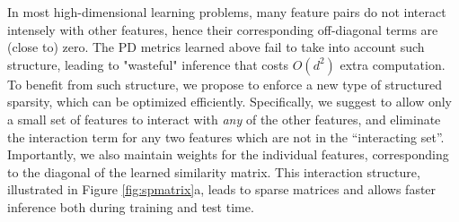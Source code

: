 \documentclass[twoside,11pt]{article}
\begin{document}
In most high-dimensional learning problems, many feature pairs do not interact intensely with other features, hence their corresponding off-diagonal terms are (close to) zero. The PD metrics learned above fail to take into account such structure, leading to  "wasteful" inference that costs $O(d^2)$ extra computation. To benefit from such structure, we propose to enforce a new type of structured sparsity, which can be optimized efficiently. Specifically, we suggest to allow only a small set of features to interact with \emph{any} of the other features, and eliminate the interaction term for any two features which are not in the ``interacting set''. Importantly, we also maintain weights for the individual features, corresponding to the diagonal of the learned similarity matrix. This interaction structure,  illustrated in Figure \ref{fig:spmatrix}a, leads to sparse matrices and allows faster inference both during training and test time.
\end{document}

